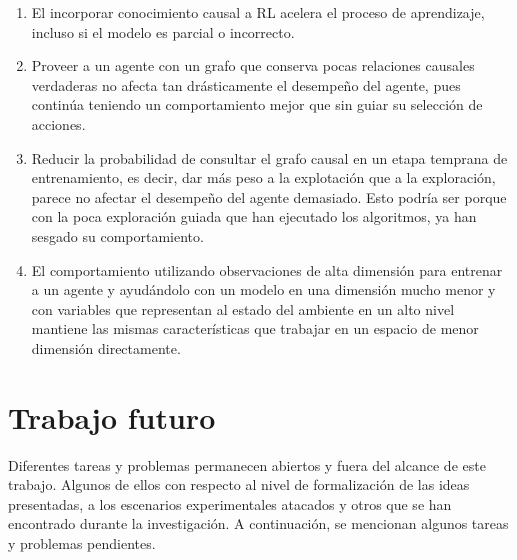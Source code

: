 \begin{enumerate}
\item El incorporar conocimiento causal a RL acelera el proceso de
aprendizaje, incluso si el modelo es parcial o incorrecto.
    \item Proveer a un agente con un grafo que conserva pocas relaciones
    causales verdaderas no afecta tan drásticamente el desempeño del agente, pues 
    continúa teniendo un comportamiento mejor que sin guiar su selección de acciones.
    \item Reducir la probabilidad de consultar el grafo causal en un etapa 
    temprana de entrenamiento, es decir, dar más peso a la explotación que a la exploración, parece no afectar el desempeño del agente demasiado. Esto podría
    ser porque con la poca exploración guiada que han ejecutado los algoritmos,
    ya han sesgado su comportamiento.
    \item El comportamiento utilizando observaciones de alta dimensión para entrenar a un agente y ayudándolo con un modelo en una dimensión mucho menor y con variables que representan al estado del ambiente en un alto nivel mantiene las mismas características que trabajar en un espacio de menor dimensión directamente.
\end{enumerate}

\section{Trabajo futuro}

Diferentes tareas y problemas permanecen abiertos y fuera del alcance de este trabajo. Algunos de ellos con respecto al nivel de formalización de las ideas presentadas, a los escenarios experimentales atacados  y otros que se han encontrado durante la investigación. A continuación, se 
mencionan algunos tareas y problemas pendientes.

